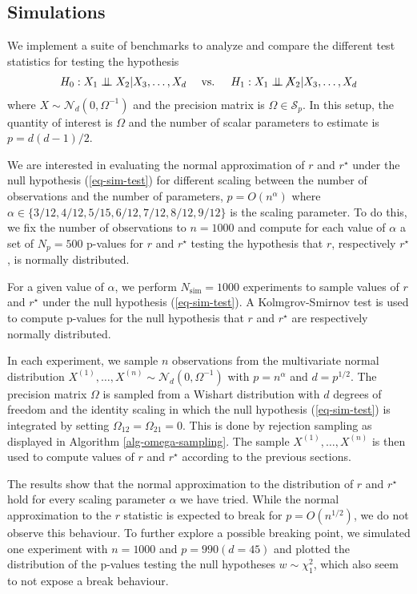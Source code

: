 \subsection{Simulations}
We implement a suite of benchmarks to analyze and compare the different test statistics for testing the hypothesis
\begin{align}\label{eq-sim-test}
    H_0: X_1 \independent X_2 | X_3, \ldots, X_d && \text{ vs. } && H_1: X_1 \notindependent X_2 | X_3, \ldots, X_d 
\end{align}
where $X \sim \mathcal{N}_d(0, \Omega^{-1})$ and the precision matrix is $\Omega \in \mathcal{S}_p$. In this setup, the quantity of interest is $\Omega$ and the number of scalar parameters to estimate is $p = d(d-1)/2$. 


We are interested in evaluating the normal approximation of $r$ and $r^\star$ under the null hypothesis (\ref{eq-sim-test}) for different scaling between the number of observations and the number of parameters, $p = O(n^\alpha)$ where $\alpha \in \{3/12, 4/12, 5/15, 6/12, 7/12, 8/12, 9/12\}$ is the scaling parameter. To do this, we fix the number of observations to $n = 1000$ and compute for each value of $\alpha$ a set of $N_p=500$ p-values for $r$ and $r^\star$ testing the hypothesis that $r$, respectively $r^\star$, is normally distributed. 

For a given value of $\alpha$, we perform $N_{\text{sim}} = 1000$ experiments to sample values of $r$ and $r^\star$ under the null hypothesis (\ref{eq-sim-test}). A Kolmgrov-Smirnov test is used to compute p-values for the null hypothesis that $r$ and $r^\star$ are respectively normally distributed.

In each experiment, we sample $n$ observations from the multivariate normal distribution $X^{(1)}, \ldots, X^{(n)} \sim \mathcal{N}_d(0, \Omega^{-1})$ with $p = n^\alpha$ and $d = p^{1/2}$. The precision matrix $\Omega$ is sampled from a Wishart distribution with $d$ degrees of freedom and the identity scaling in which the null hypothesis (\ref{eq-sim-test}) is integrated by setting $\Omega_{12} = \Omega_{21} = 0$. This is done by rejection sampling as displayed in Algorithm \ref{alg-omega-sampling}. The sample $X^{(1)}, \ldots, X^{(n)}$ is then used to compute values of $r$ and $r^\star$ according to the previous sections.

The results show that the normal approximation to the distribution of $r$ and $r^\star$ hold for every scaling parameter $\alpha$ we have tried. While the normal approximation to the $r$ statistic is expected to break for $p = O(n^{1/2})$, we do not observe this behaviour. To further explore a possible breaking point, we simulated one experiment with $n = 1000$ and $p = 990 (d = 45)$ and plotted the distribution of the p-values testing the null hypotheses $w \sim \chi^2_1$, which also seem to not expose a break behaviour.

